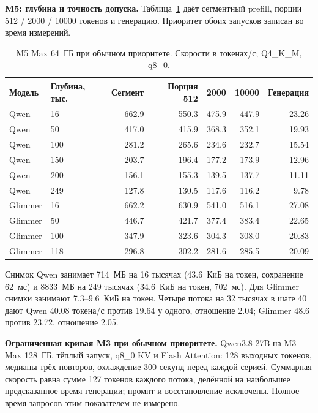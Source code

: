 \textbf{M5: глубина и точность допуска.} Таблица~\ref{tab:m5-pri31-ladder} даёт сегментный prefill,
порции 512 / 2000 / 10000 токенов и генерацию. Приоритет обоих запусков записан во время измерений.
\begin{table}[t]
\centering
\caption{M5 Max 64~ГБ при обычном приоритете. Скорости в токенах/с; Q4\_K\_M, q8\_0.}
\label{tab:m5-pri31-ladder}
\footnotesize
\begin{tabular}{llrrrrr}
\toprule
Модель & Глубина, тыс. & Сегмент & Порция 512 & 2000 & 10000 & Генерация \\
\midrule
Qwen & 16 & 662.9 & 550.3 & 475.9 & 447.9 & 23.26 \\
Qwen & 50 & 417.0 & 415.9 & 368.3 & 352.1 & 19.93 \\
Qwen & 100 & 281.2 & 265.6 & 234.6 & 232.7 & 15.54 \\
Qwen & 150 & 203.7 & 196.4 & 177.2 & 173.9 & 12.96 \\
Qwen & 200 & 156.1 & 155.3 & 139.5 & 137.7 & 11.11 \\
Qwen & 249 & 127.8 & 130.5 & 117.6 & 116.2 & 9.78 \\
Glimmer & 16 & 662.2 & 630.9 & 541.0 & 516.1 & 27.08 \\
Glimmer & 50 & 446.7 & 421.7 & 377.4 & 383.4 & 22.65 \\
Glimmer & 100 & 347.9 & 323.6 & 304.3 & 308.0 & 20.83 \\
Glimmer & 118 & 296.8 & 302.2 & 281.6 & 285.5 & 20.09 \\
\bottomrule
\end{tabular}
\end{table}

Снимок Qwen занимает 714~МБ на 16 тысячах (43.6~КиБ на токен, сохранение 62~мс)
и 8833~МБ на 249 тысячах (34.6~КиБ на токен, 702~мс).
Для Glimmer снимки занимают 7.3--9.6~КиБ на токен. Четыре потока на 32 тысячах в шаге 40
дают Qwen 40.08 токена/с против 19.64 у одного, отношение 2.04;
Glimmer 48.6 против 23.72, отношение 2.05.

\textbf{Ограниченная кривая M3 при обычном приоритете.} Qwen3.8-27B на M3 Max 128~ГБ,
тёплый запуск, q8\_0 KV и Flash Attention: 128 выходных токенов,
медианы трёх повторов, охлаждение 300 секунд перед каждой серией.
Суммарная скорость равна сумме 127 токенов каждого потока, делённой на наибольшее предсказанное время генерации;
промпт и восстановление исключены. Полное время запросов этим показателем не измерено.

